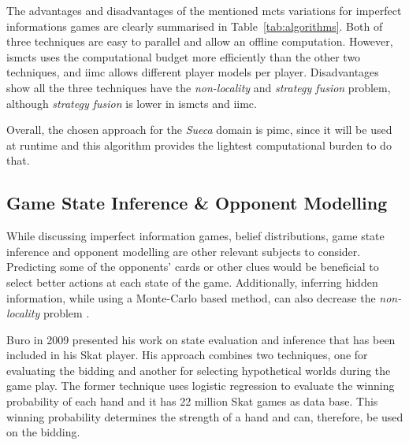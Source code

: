 The advantages and disadvantages of the mentioned \ac{mcts} variations for imperfect informations games are clearly summarised in Table~\ref{tab:algorithms}.
Both of three techniques are easy to parallel and allow an offline computation. However, \ac{ismcts} uses the computational budget more efficiently than the other two techniques, and \ac{iimc} allows different player models per player.
Disadvantages show all the three techniques have the \emph{non-locality} and \emph{strategy fusion} problem, although \emph{strategy fusion} is lower in \ac{ismcts} and \ac{iimc}.

Overall, the chosen approach for the \emph{Sueca} domain is \ac{pimc}, since it will be used at runtime and this algorithm provides the lightest computational burden to do that.



\subsection{Game State Inference \& Opponent Modelling}


While discussing imperfect information games, belief distributions, game state inference and opponent modelling are other relevant subjects to consider.
Predicting some of the opponents' cards or other clues would be beneficial to select better actions at each state of the game. Additionally, inferring hidden information, while using a Monte-Carlo based method, can also decrease the \emph{non-locality} problem \cite{Cowling2012}.


Buro in 2009 \cite{Buro} presented his work on state evaluation and inference that has been included in his Skat player.
His approach combines two techniques, one for evaluating the bidding and another for selecting hypothetical worlds during the game play.
The former technique uses logistic regression to evaluate the winning probability of each hand and it has 22 million Skat games as data base.
This winning probability determines the strength of a hand and can, therefore, be used on the bidding.



